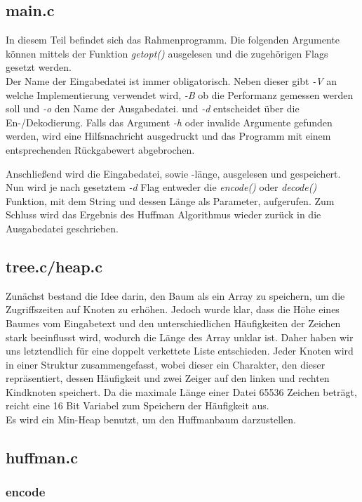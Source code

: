 \documentclass[course=erap]{aspdoc}
\begin{document}
\subsection{main.c}
In diesem Teil befindet sich das Rahmenprogramm. Die folgenden Argumente können mittels der Funktion \textit{getopt()} ausgelesen und die zugehörigen Flags gesetzt werden.\\
Der Name der Eingabedatei ist immer obligatorisch. Neben dieser gibt \textit{-V} an welche Implementierung verwendet wird, \textit{-B} ob die Performanz gemessen werden soll und \textit{-o} den Name der Ausgabedatei. und \textit{-d} entscheidet über die En-/Dekodierung. Falls das Argument \textit{-h} oder invalide Argumente gefunden werden, wird eine Hilfsnachricht ausgedruckt und das Programm mit einem entsprechenden Rückgabewert abgebrochen.

Anschließend wird die Eingabedatei, sowie -länge, ausgelesen und gespeichert. Nun wird je nach gesetztem \textit{-d} Flag entweder die \textit{encode()} oder \textit{decode()} Funktion, mit dem String und dessen Länge als Parameter, aufgerufen.
Zum Schluss wird das Ergebnis des Huffman Algorithmus wieder zurück in die Ausgabedatei geschrieben.

\subsection{tree.c/heap.c}
Zunächst bestand die Idee darin, den Baum als ein Array zu speichern, um die Zugriffszeiten auf Knoten zu erhöhen. Jedoch wurde klar, dass die Höhe eines Baumes vom Eingabetext und den unterschiedlichen Häufigkeiten der Zeichen stark beeinflusst wird, wodurch die Länge des Array unklar ist. Daher haben wir uns letztendlich für eine doppelt verkettete Liste entschieden. Jeder Knoten wird in einer Struktur zusammengefasst, wobei dieser ein Charakter, den dieser repräsentiert, dessen Häufigkeit und zwei Zeiger auf den linken und rechten Kindknoten speichert. Da die maximale Länge einer Datei 65536 Zeichen beträgt, reicht eine 16 Bit Variabel zum Speichern der Häufigkeit aus.\\
Es wird ein Min-Heap benutzt, um den Huffmanbaum darzustellen.




\subsection{huffman.c}
\subsubsection{encode}
\label{sec:encode}
\end{document}
